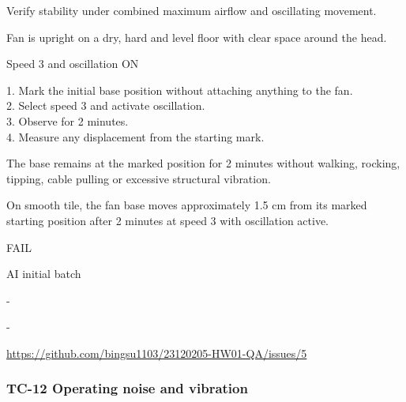 \begin{description}[style=nextline,leftmargin=3.2cm]

\item[Objective] Verify stability under combined maximum airflow and oscillating movement.

\item[Preconditions] Fan is upright on a dry, hard and level floor with clear space around the head.

\item[Input] Speed 3 and oscillation ON

\item[Steps] 1. Mark the initial base position without attaching anything to the fan.\\ 2. Select speed 3 and activate oscillation.\\ 3. Observe for 2 minutes.\\ 4. Measure any displacement from the starting mark.

\item[Expected] The base remains at the marked position for 2 minutes without walking, rocking, tipping, cable pulling or excessive structural vibration.

\item[Actual] On smooth tile, the fan base moves approximately 1.5 cm from its marked starting position after 2 minutes at speed 3 with oscillation active.

\item[Verdict] FAIL

\item[Source] AI initial batch

\item[Edge case] -

\item[Video] -

\item[Issue] \url{https://github.com/bingsu1103/23120205-HW01-QA/issues/5}

\end{description}

\clearpage

\subsubsection{TC-12 Operating noise and vibration}

